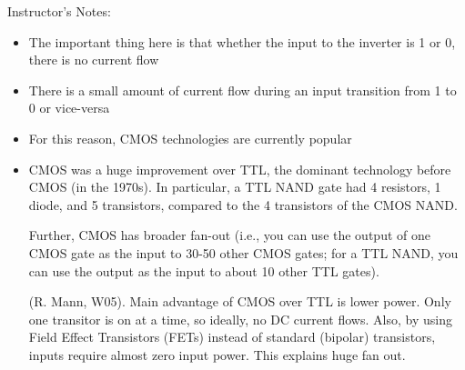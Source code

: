 \begin{frame}[fragile]
Instructor's Notes:
\begin{itemize}
\item The important thing here is that whether the input to the inverter is 1 or 0, there is no current flow
\item There is a small amount of current flow during an input transition from 1 to 0 or vice-versa
\item For this reason, CMOS technologies are currently popular

\item CMOS was a huge improvement over TTL, the dominant technology before
	CMOS (in the 1970s).  In particular, a TTL NAND
	gate had 4 resistors, 1 diode, and 5 transistors, compared to
	the 4 transistors of the CMOS NAND.  

	Further, CMOS has broader
	fan-out (i.e., you can use the output of one CMOS gate as the
	input to 30-50 other CMOS gates; for a TTL NAND, you can use
	the output as the input to about 10 other TTL gates).

        (R. Mann, W05).  Main advantage of CMOS over TTL is lower power.  Only
        one transitor is on at a time, so ideally, no DC current flows.  Also,
        by using Field Effect Transistors (FETs) instead of standard (bipolar)
        transistors, inputs require almost zero input power.  This explains
        huge fan out.

\end{itemize}
\end{frame}
\fi\ENotes


